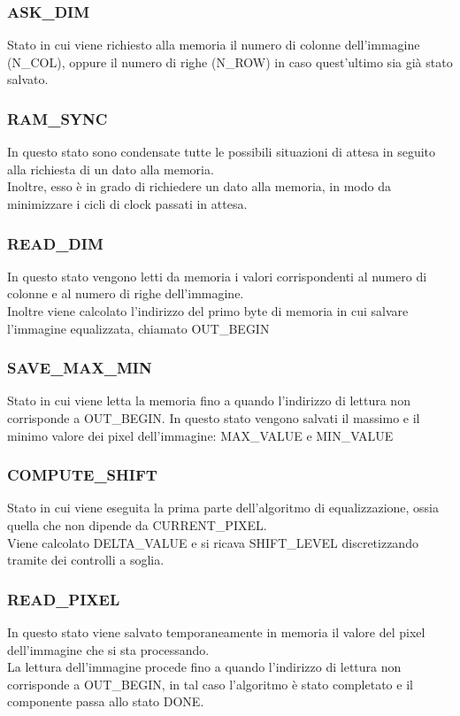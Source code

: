 \documentclass[a4paper, 12pt]{article}
\begin{document}
\subsubsection{ASK\_DIM}
Stato in cui viene richiesto alla memoria il numero di colonne dell'immagine (N\_COL), oppure il numero di righe (N\_ROW) in caso quest'ultimo sia già stato salvato.
\subsubsection{RAM\_SYNC}
In questo stato sono condensate tutte le possibili situazioni di attesa in seguito alla richiesta di un dato alla memoria. \\
Inoltre, esso è in grado di richiedere un dato alla memoria, in modo da minimizzare i cicli di clock passati in attesa.
\subsubsection{READ\_DIM}
In questo stato vengono letti da memoria i valori corrispondenti al numero di colonne e al numero di righe dell'immagine. \\
Inoltre viene calcolato l'indirizzo del primo byte di memoria in cui salvare l'immagine equalizzata, chiamato OUT\_BEGIN
\subsubsection{SAVE\_MAX\_MIN}
Stato in cui viene letta la memoria fino a quando l'indirizzo di lettura non corrisponde a OUT\_BEGIN.
In questo stato vengono salvati il massimo e il minimo valore dei pixel dell'immagine: MAX\_VALUE e MIN\_VALUE
\subsubsection{COMPUTE\_SHIFT}
Stato in cui viene eseguita la prima parte dell'algoritmo di equalizzazione, ossia quella che non dipende da CURRENT\_PIXEL. \\
Viene calcolato DELTA\_VALUE e si ricava SHIFT\_LEVEL discretizzando tramite dei controlli a soglia.
\subsubsection{READ\_PIXEL}
In questo stato viene salvato temporaneamente in memoria il valore del pixel dell'immagine che si sta processando. \\
La lettura dell'immagine procede fino a quando l'indirizzo di lettura non corrisponde a OUT\_BEGIN, in tal caso l'algoritmo è stato completato e il componente passa allo stato DONE.
\end{document}
